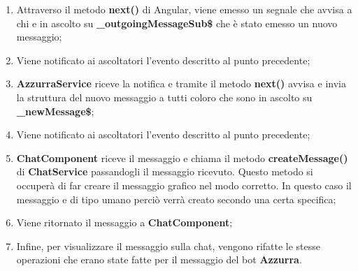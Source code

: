 \begin{enumerate}
	\item Attraverso il metodo \textbf{next()} di Angular, viene emesso un segnale che avvisa a chi e in ascolto su \textbf{\_outgoingMessageSub\$} che è stato emesso un nuovo messaggio;
	\item Viene notificato ai ascoltatori l'evento descritto al punto precedente;
	\item \textbf{AzzurraService} riceve la notifica e tramite il metodo \textbf{next()} avvisa e invia la struttura del nuovo messaggio a tutti coloro che sono in ascolto su \textbf{\_newMessage\$};
	\item Viene notificato ai ascoltatori l'evento descritto al punto precedente;
	\item \textbf{ChatComponent} riceve il messaggio e chiama il metodo \textbf{createMessage()} di \textbf{ChatService} passandogli il messaggio ricevuto. Questo metodo si occuperà di far creare il messaggio grafico nel modo corretto. In questo caso il messaggio e di tipo umano perciò verrà creato secondo una certa specifica;
	\item Viene ritornato il messaggio a \textbf{ChatComponent};
	\item Infine, per visualizzare il messaggio sulla chat, vengono rifatte le stesse operazioni che erano state fatte per il messaggio del bot \textbf{Azzurra}.

\end{enumerate}